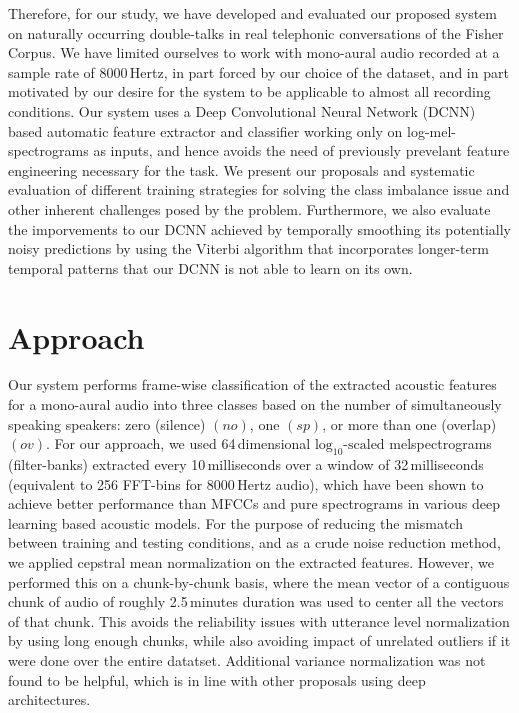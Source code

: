 \documentclass[a4paper]{article}
\begin{document}
Therefore, for our study, we have developed and evaluated our proposed system on naturally occurring double-talks in real telephonic conversations of the Fisher Corpus.  %
We have limited ourselves to work with mono-aural audio recorded at a sample rate of 8000\,Hertz,
in part forced by our choice of the dataset,
and in part motivated by our desire for the system to be applicable to almost all recording conditions.
Our system uses a Deep Convolutional Neural Network (DCNN) based automatic feature extractor and classifier working only on log-mel-spectrograms as inputs,
and hence avoids the need of previously prevelant feature engineering necessary for the task.
We present our proposals and systematic evaluation of different training strategies for solving the class imbalance issue and other inherent challenges posed by the problem.
Furthermore, we also evaluate the imporvements to our DCNN achieved by temporally smoothing its potentially noisy predictions
by using the Viterbi algorithm that incorporates longer-term temporal patterns that our DCNN is not able to learn on its own.

\section{Approach}
Our system performs frame-wise classification of the extracted acoustic features for a mono-aural audio into three classes based on the number of simultaneously speaking speakers:
zero (silence) $(no)$, one $(sp)$, or more than one (overlap) $(ov)$.
For our approach, we used 64\,dimensional $\text{log}_{10} \text{-scaled}$ melspectrograms (filter-banks)
extracted every 10\,milliseconds over a window of 32\,milliseconds (equivalent to 256 FFT-bins for 8000\,Hertz audio),
which have been shown to achieve better performance than MFCCs and pure spectrograms in various deep learning based acoustic models.  %
For the purpose of reducing the mismatch between training and testing conditions, and as a crude noise reduction method,
we applied cepstral mean normalization on the extracted features.
However, we performed this on a chunk-by-chunk basis,
where the mean vector of a contiguous chunk of audio of roughly 2.5\,minutes duration was used to center all the vectors of that chunk.
This avoids the reliability issues with utterance level normalization by using long enough chunks,
while also avoiding impact of unrelated outliers if it were done over the entire datatset.
Additional variance normalization was not found to be helpful,
which is in line with other proposals using deep architectures.  %
\end{document}
